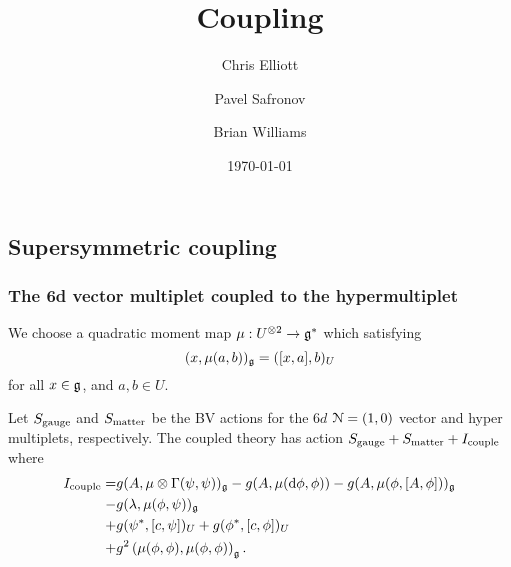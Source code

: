 \documentclass[10pt, oneside]{article}
\title{Coupling}
\author{Chris Elliott\and Pavel Safronov \and Brian Williams}
\date{\today}
\begin{document}
\maketitle

\subsection{Supersymmetric coupling}
\subsubsection{The 6d vector multiplet coupled to the hypermultiplet}


We choose a quadratic moment map $\mu : U^{\otimes 2} \to \mathfrak g^*$ which satisfying
\[
(x, \mu(a, b))_{\mathfrak g} = ([x, a], b)_U
\]
for all $x \in \mathfrak g$, and $a,b \in U$.

Let $S_{\rm gauge}$ and $S_{\rm matter}$ be the BV actions for the $6d$ $\mathcal N=(1,0)$ vector and hyper multiplets, respectively. 
The coupled theory has action $S_{\rm gauge} + S_{\rm matter} + I_{\rm couple}$ where
\begin{align*}
I_{\rm couple} = & g (A, \mu \otimes \Gamma (\psi, \psi))_\mathfrak g - g (A, \mu({\rm d} \phi, \phi)) - g (A, \mu(\phi, [A, \phi]))_\mathfrak g \\  - & 
g (\lambda, \mu(\phi, \psi))_\mathfrak g \\ + & g (\psi^*, [c, \psi])_U + g (\phi^*, [c, \phi])_U \\ + & g^2 \left(\mu(\phi, \phi), \mu(\phi, \phi) \right)_\mathfrak g .
\end{align*}

\end{document}
